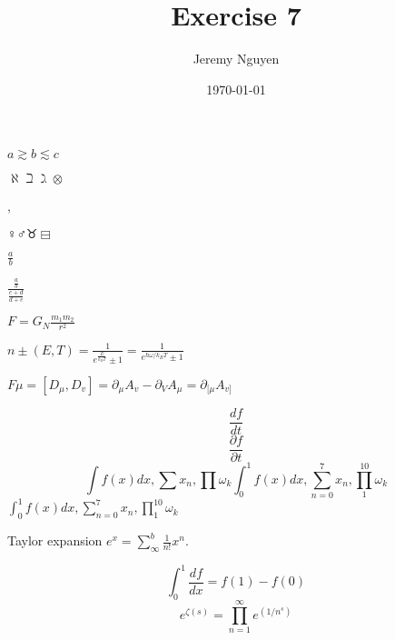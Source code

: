 \documentclass[11pt]{article}
\begin{document}
\title{Exercise 7}
\author{Jeremy Nguyen}
\date{\today}
\maketitle

$a \gtrsim b \lesssim c$

$\aleph \beth \gimel \otimes$

\mercury, \earth

$\female \male \taurus \boxminus$
\textschwa

$\frac{a}{b}$

$\frac{\frac{a}{b}}{\frac{c+d}{d+e}}$

$F = G_{N}\frac{m_{1}m_{2}}{r^2}$

$n\pm(E,T)=\frac{1}{e^{\frac{E}{k_{B}T}}\pm1}=\frac{1}{e^{{\hbar\omega/k_{B}T}}\pm1}$

$F\mu = [D_{\mu}, D_{v}] =
	\partial_{\mu}A_{v} - \partial_{V}A_{\mu} =
	\partial_{[\mu}A_{v]} $


\[\frac{df}{dt}\]
\[\frac{\partial f}{\partial t}\]
\[\int f(x) dx, \sum x_n, \prod \omega_k\int_0^1 f(x)dx, \sum_{n=0}^7
	x_n, \prod_1^{10} \omega_k\]
$\int_0^1 f(x)dx, \sum_{n=0}^7 x_n, \prod_1^{10} \omega_k$

\center
Taylor expansion $e^x = \sum_\infty^b \frac{1}{n!}x^{n}$.

\[\int_{0}^{1} \frac{df}{dx} = f(1) - f(0)\]
\[e^{\zeta(s)} = \prod_{n=1}^\infty e^(1/n^s)\]
\end{document}

